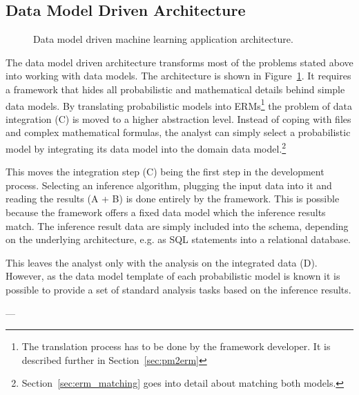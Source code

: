 \subsection{Data Model Driven Architecture}

\begin{figure}
\centering
\scalebox{\tikzScale}{\adjustTikzSize }
\caption{Data model driven machine learning application architecture.}\label{fig:ml-application-architecture-dm}
\end{figure}

The data model driven architecture transforms most of the problems stated above into working with data models. The architecture is shown in Figure~\ref{fig:ml-application-architecture-dm}. It requires a framework that hides all probabilistic and mathematical details behind simple data models. By translating probabilistic models into ERMs\footnote{The translation process has to be done by the framework developer. It is described further in Section~\ref{sec:pm2erm}} the problem of data integration (C) is moved to a higher abstraction level. Instead of coping with files and complex mathematical formulas, the analyst can simply select a probabilistic model by integrating its data model into the domain data model.\footnote{Section~\ref{sec:erm_matching} goes into detail about matching both models.}

This moves the integration step (C) being the first step in the development process. Selecting an inference algorithm, plugging the input data into it and reading the results (A + B) is done entirely by the framework. This is possible because the framework offers a fixed data model which the inference results match. The inference result data are simply included into the schema, depending on the underlying architecture, e.g. as SQL statements into a relational database.

This leaves the analyst only with the analysis on the integrated data (D). However, as the data model template of each probabilistic model is known it is possible to provide a set of standard analysis tasks based on the inference results.

---

